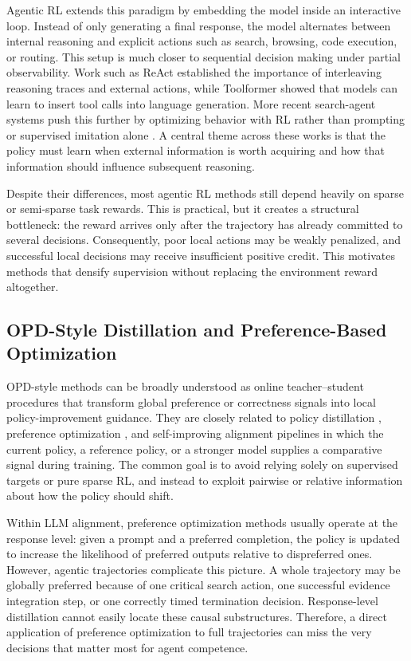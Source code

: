 \documentclass[11pt]{article}
\begin{document}
Agentic RL extends this paradigm by embedding the model inside an interactive loop. Instead of only generating a final response, the model alternates between internal reasoning and explicit actions such as search, browsing, code execution, or routing. This setup is much closer to sequential decision making under partial observability. Work such as ReAct \citep{yao2023react} established the importance of interleaving reasoning traces and external actions, while Toolformer \citep{schick2023toolformer} showed that models can learn to insert tool calls into language generation. More recent search-agent systems push this further by optimizing behavior with RL rather than prompting or supervised imitation alone \citep{jin2025search,jin2025empirical}. A central theme across these works is that the policy must learn when external information is worth acquiring and how that information should influence subsequent reasoning.

Despite their differences, most agentic RL methods still depend heavily on sparse or semi-sparse task rewards. This is practical, but it creates a structural bottleneck: the reward arrives only after the trajectory has already committed to several decisions. Consequently, poor local actions may be weakly penalized, and successful local decisions may receive insufficient positive credit. This motivates methods that densify supervision without replacing the environment reward altogether.

\subsection{OPD-Style Distillation and Preference-Based Optimization}
OPD-style methods can be broadly understood as online teacher--student procedures that transform global preference or correctness signals into local policy-improvement guidance. They are closely related to policy distillation \citep{rusu2015policy}, preference optimization \citep{rafailov2024dpo,azar2024ipo}, and self-improving alignment pipelines in which the current policy, a reference policy, or a stronger model supplies a comparative signal during training. The common goal is to avoid relying solely on supervised targets or pure sparse RL, and instead to exploit pairwise or relative information about how the policy should shift.

Within LLM alignment, preference optimization methods usually operate at the response level: given a prompt and a preferred completion, the policy is updated to increase the likelihood of preferred outputs relative to dispreferred ones. However, agentic trajectories complicate this picture. A whole trajectory may be globally preferred because of one critical search action, one successful evidence integration step, or one correctly timed termination decision. Response-level distillation cannot easily locate these causal substructures. Therefore, a direct application of preference optimization to full trajectories can miss the very decisions that matter most for agent competence.
\end{document}
